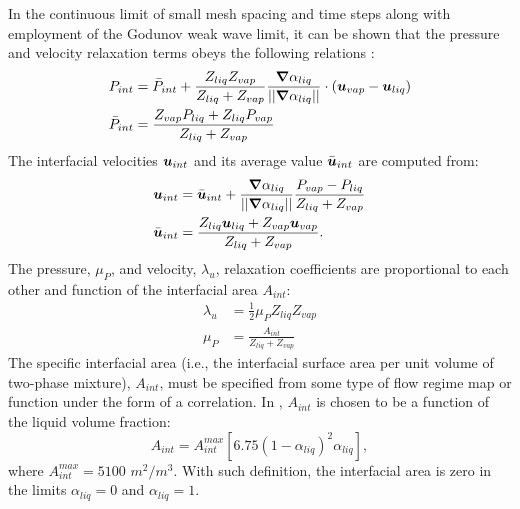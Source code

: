 In the continuous limit of small mesh spacing and time steps along with employment of the Godunov weak wave limit, it can be shown that the pressure and velocity relaxation terms obeys the following relations \cite{Berry_2008b, Chinnayya_2004}:
%
\begin{align}
  \label{E-R:83}
  P_{int} &= \bar{P}_{int} + \frac{Z_{liq}Z_{vap}}{Z_{liq}+Z_{vap}} \frac{\boldsymbol{\nabla} \alpha_{liq}}{|| \boldsymbol{\nabla} \alpha_{liq} ||} \cdot (\boldsymbol u_{vap}-\boldsymbol u_{liq})
  \\
  \bar{P}_{int} &= \frac{Z_{vap}P_{liq}+Z_{liq}P_{vap}}{Z_{liq}+Z_{vap}}
\end{align}
%
The interfacial velocities $\boldsymbol u_{int}$ and its average value $\bar{\boldsymbol u}_{int}$ are computed from:
%
\begin{align}
  \label{E-R:84}
  \boldsymbol u_{int} &= \bar{\boldsymbol u}_{int} +  \frac{\boldsymbol{\nabla} \alpha_{liq}}{|| \boldsymbol{\nabla} \alpha_{liq} ||} \frac{P_{vap}-P_{liq}}{Z_{liq}+Z_{vap}}
  \\
  \bar{\boldsymbol u}_{int} &= \frac{Z_{liq} \boldsymbol u_{liq}+Z_{vap}\boldsymbol u_{vap}}{Z_{liq}+Z_{vap}}.
\end{align}
%
The pressure, $\mu_P$, and velocity, $\lambda_u$, relaxation coefficients are proportional to each other and function of the interfacial area $A_{int}$:
%
\begin{align}
  \label{E-R:85}
  \lambda_u &= \frac{1}{2} \mu_P Z_{liq} Z_{vap}
  \\
  \label{E-R:86}
  \mu_P &= \frac{A_{int}}{Z_{liq}+Z_{vap}}
\end{align}
The specific interfacial area (i.e., the interfacial surface area per unit
volume of two-phase mixture), $A_{int}$, must be specified from some type of
flow regime map or function under the form of a correlation. In \cite{SEM}, $A_{int}$ is chosen to be a function of the liquid volume fraction:
%
\begin{equation}\label{eq:Aint-sect4}
A_{int} = A_{int}^{max} \left[ 6.75 \left(1-\alpha_{liq} \right)^2 \alpha_{liq} \right],
\end{equation}
% 
where $A_{int}^{max} = 5100$ $m^2 / m^3$. With such definition, the interfacial area is zero in the limits $\alpha_{liq} = 0$ and $\alpha_{liq} = 1$. 
